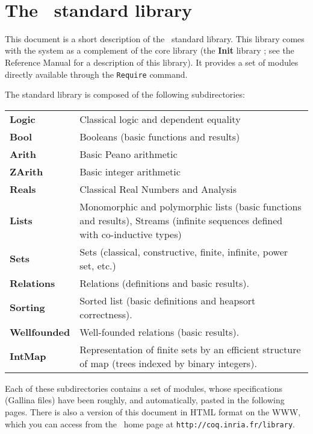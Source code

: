 \documentclass[11pt]{article}
\begin{document}
 
%
{\ }

\tableofcontents

\newpage
\section*{The \Coq\ standard library}

This document is a short description of the \Coq\ standard library.
This library comes with the system as a complement of the core library
(the {\bf Init} library ; see the Reference Manual for a description
of this library). It provides a set of modules directly available
through the \verb!Require! command.

The standard library is composed of the following subdirectories:

\medskip
\begin{tabular}{lp{12cm}}
  {\bf Logic}   & Classical logic and dependent equality \\
  {\bf Bool}    & Booleans (basic functions and results) \\
  {\bf Arith}   & Basic Peano arithmetic \\
  {\bf ZArith}  & Basic integer arithmetic \\
  {\bf Reals}   & Classical Real Numbers and Analysis \\
  {\bf Lists}   & Monomorphic and polymorphic lists (basic functions and
                  results), Streams (infinite sequences defined 
                  with co-inductive types) \\
  {\bf Sets}    & Sets (classical, constructive, finite, infinite, power set,
                  etc.) \\
  {\bf Relations}   & Relations (definitions and basic results). \\
  {\bf Sorting}  & Sorted list (basic definitions and heapsort correctness). \\
  {\bf Wellfounded} & Well-founded relations (basic results). \\
  {\bf IntMap}      & Representation of finite sets by an efficient
                      structure of map (trees indexed by binary integers).\\

\end{tabular}
\medskip

Each of these subdirectories contains a set of modules, whose
specifications ({\sf Gallina} files) have
been roughly, and automatically, pasted in the following pages. There
is also a version of this document in HTML format on the WWW, which
you can access from the \Coq\ home page at
\texttt{http://coq.inria.fr/library}.


\end{document}
